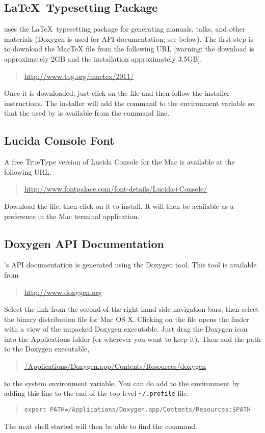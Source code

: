 \subsection{\LaTeX\ Typesetting Package}

\Stan uses the \LaTeX\ typesetting package for generating manuals,
talks, and other materials (Doxygen is used for API documentation; see
below).  The first step is to download the MacTeX  file
from the following URL [warning: the download is approximately 2GB and
the installation approximately 3.5GB].
%
\begin{quote}
\url{http://www.tug.org/mactex/2011/}
\end{quote}
%
Once it is downloaded, just click on the  file and then
follow the installer instructions.  The installer will add the command
to the  environment variable so that the 
used by \Stan is available from the command line.


\subsection{Lucida Console Font}

A free TrueType version of Lucida Console for the Mac is available
at the following URL.
%
\begin{quote}
\url{http://www.fontpalace.com/font-details/Lucida+Console/}
\end{quote}
%
Download the  file, then click on it to install.  It
will then be available as a preference in the Mac terminal application.

\subsection{Doxygen API Documentation}

\Stan's API documentation is generated using the Doxygen tool.   This
tool is available from
%
\begin{quote}
\url{http://www.doxygen.org}
\end{quote}
%
Select the  link from the second of the right-hand side
navigation bars, then select the binary distribution  file
for Mac OS X.  Clicking on the  file opens the finder with
a view of the unpacked Doxygen executable.  Just drag the Doxygen icon
into the Applications folder (or wherever you want to keep it).  Then
add the path to the Doxygen executable, 
%
\begin{quote}
\url{/Applications/Doxygen.app/Contents/Resources/doxygen}
\end{quote}
%
to the system  environment variable.  You can do add to the
 environment by adding this line to the end of the
top-level \Verb|~/.profile| file.  
%
\begin{quote}
\begin{Verbatim}
export PATH=/Applications/Doxygen.app/Contents/Resources:$PATH
\end{Verbatim}
\end{quote}
%
The next shell started will then be able to find the  command.


